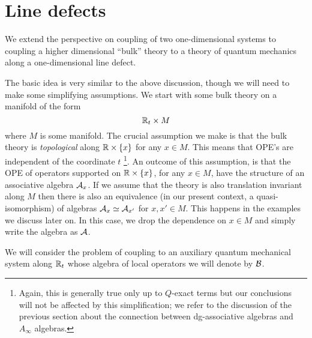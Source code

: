 \documentclass[11pt]{amsart}
\def\brian#1{{\textcolor{blue!65!red}{BRW: {#1}}}}
\begin{document}




\section{Line defects}
\label{s:lines}


We extend the perspective on coupling of two one-dimensional systems to coupling a higher dimensional ``bulk'' theory to a theory of quantum mechanics along a one-dimensional line defect. 

The basic idea is very similar to the above discussion, though we will need to make some simplifying assumptions. 
We start with some bulk theory on a manifold of the form 
\[
\mathbb R_t \times M 
\] 
where $M$ is some manifold. 
The crucial assumption we make is that the bulk theory is {\em topological} along $\mathbb R \times \{x\}$ for any $x \in M$. 
This means that OPE's are independent of the coordinate $t$ \footnote{Again, this is generally true only up to $Q$-exact terms but our conclusions will not be affected by this simplification; we refer to the discussion of the previous section about the connection between dg-associative algebras and $A_{\infty}$ algebras.}.
An outcome of this assumption, is that the OPE of operators supported on $\mathbb R \times \{x\}$, for any $x \in M$, have the structure of an associative algebra $\mathcal A_x$. 
If we assume that the theory is also translation invariant along $M$ then there is also an equivalence (in our present context, a quasi-isomorphism) of algebras $\mathcal A_x \simeq \mathcal A_{x'}$ for $x, x' \in M$. 
This happens in the examples we discuss later on.
In this case, we drop the dependence on $x \in M$ and simply write the algebra as $\mathcal A$. 

We will consider the problem of coupling to an auxiliary quantum mechanical system along $\mathbb R_t$ whose algebra of local operators we will denote by $\mathcal B$. 
\end{document}
